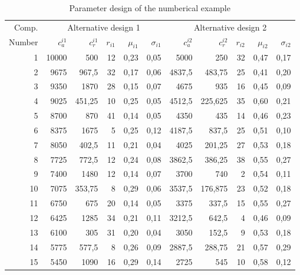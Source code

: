\documentclass[preprint,12pt]{elsarticle}
\begin{document}
\begin{table}[htbp]
  \centering
  \caption{Parameter design of the numberical example}
    \begin{tabular}{rrrrrrrrrrr}
    \toprule
Comp.          & \multicolumn{5}{c}{Alternative design 1} & \multicolumn{5}{c}{Alternative design 2} \\
Number    & $c_{a}^{i1}$ & $c_{r}^{i1}$ & $r_{i1}$ & $\mu_{i1}$ & $\sigma_{i1}$ & $c_{a}^{i2}$ & $c_{r}^{i2}$ & $r_{i2}$ & $\mu_{i2}$ & $\sigma_{i2}$ \\
    \midrule
    1     & 10000 & 500   & 12    & 0,23  & 0,05  & 5000  & 250   & 32    & 0,47  & 0,17 \\
    2     & 9675  & 967,5 & 32    & 0,17  & 0,06  & 4837,5 & 483,75 & 25    & 0,41  & 0,20 \\
    3     & 9350  & 1870  & 28    & 0,15  & 0,07  & 4675  & 935   & 16    & 0,45  & 0,09 \\
    4     & 9025  & 451,25 & 10    & 0,25  & 0,05  & 4512,5 & 225,625 & 35    & 0,60  & 0,21 \\
    5     & 8700  & 870   & 41    & 0,14  & 0,05  & 4350  & 435   & 14    & 0,46  & 0,23 \\
    6     & 8375  & 1675  & 5     & 0,25  & 0,12  & 4187,5 & 837,5 & 25    & 0,51  & 0,10 \\
    7     & 8050  & 402,5 & 11    & 0,21  & 0,04  & 4025  & 201,25 & 27    & 0,53  & 0,18 \\
    8     & 7725  & 772,5 & 12    & 0,24  & 0,08  & 3862,5 & 386,25 & 38    & 0,55  & 0,27 \\
    9     & 7400  & 1480  & 12    & 0,14  & 0,07  & 3700  & 740   & 2     & 0,54  & 0,11 \\
    10    & 7075  & 353,75 & 8     & 0,29  & 0,06  & 3537,5 & 176,875 & 23    & 0,52  & 0,18 \\
    11    & 6750  & 675   & 20    & 0,14  & 0,05  & 3375  & 337,5 & 15    & 0,55  & 0,27 \\
    12    & 6425  & 1285  & 34    & 0,21  & 0,11  & 3212,5 & 642,5 & 4     & 0,46  & 0,09 \\
    13    & 6100  & 305   & 31    & 0,20  & 0,04  & 3050  & 152,5 & 9     & 0,53  & 0,18 \\
    14    & 5775  & 577,5 & 8     & 0,26  & 0,09  & 2887,5 & 288,75 & 21    & 0,57  & 0,29 \\
    15    & 5450  & 1090  & 16    & 0,29  & 0,14  & 2725  & 545   & 10    & 0,58  & 0,12 \\

\end{tabular}
\end{table}
\end{document}
